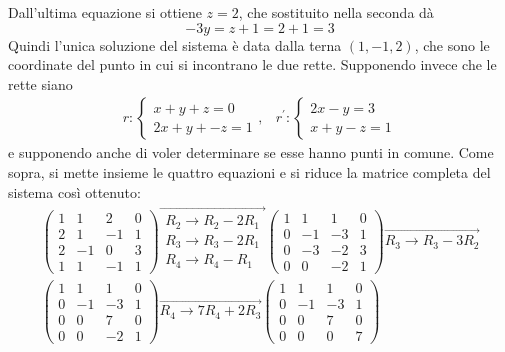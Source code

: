 Dall'ultima equazione si ottiene $z=2$, che sostituito nella seconda dà
\begin{equation*}
  -3y=z+1=2+1=3
\end{equation*}
Quindi l'unica soluzione del sistema è data dalla terna $(1,-1,2)$, che sono le coordinate
del punto in cui si incontrano le due rette.
Supponendo invece che le rette siano
\begin{eqnarray}
  \label{eq:qualcheappgeo3}
  r:
  \begin{cases}
    x+y+z=0\\
    2x+y+-z=1
  \end{cases}, & r^\prime:
                 \begin{cases}
                   2x-y=3\\
                   x+y-z=1
                 \end{cases}
\end{eqnarray}
e supponendo anche di voler determinare se esse hanno punti in comune. Come sopra, si mette insieme
le quattro equazioni e si riduce la matrice completa del sistema così ottenuto:
\begin{equation}
  \label{eq:qualcheappgeo4}
  \begin{matrix}
    \left(
    \begin{array}{ccc|c}
      1 & 1 & 2 & 0\\
      2 & 1 & -1 & 1\\
      2 & -1 & 0 & 3\\
      1 & 1 & -1 & 1
    \end{array}\right)\overrightarrow{
    \begin{matrix}
      R_2\to R_2-2R_1\\
      R_3\to R_3-2R_1\\
      R_4\to R_4-R_1
    \end{matrix}
    }\left(
    \begin{array}{ccc|c}
      1 & 1 & 1 & 0\\
      0 & -1 & -3 & 1\\
      0 & -3 & -2 & 3\\
      0 & 0 & -2 & 1
    \end{array}\right) \overrightarrow{R_3\to R_3-3R_2}\\
    \left(
    \begin{array}{ccc|c}
      1 & 1 & 1 & 0\\
      0 & -1 & -3 & 1\\
      0 & 0 & 7 & 0\\
      0 & 0 & -2 & 1
    \end{array}
    \right) \overrightarrow{R_4\to7R_4+2R_3}
    \left(\begin{array}{ccc|c}
      1 & 1 & 1 & 0\\
      0 & -1 & -3 & 1\\
      0 & 0 & 7 & 0\\
      0 & 0 & 0 & 7
    \end{array}\right)
\end{matrix}
\end{equation}
